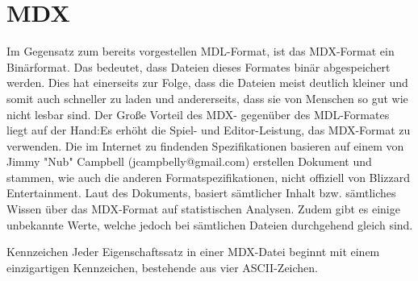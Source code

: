 \chapter{MDX}
Im Gegensatz zum bereits vorgestellen MDL-Format, ist das MDX-Format ein Binärformat. Das bedeutet, dass Dateien dieses Formates binär abgespeichert werden. Dies hat einerseits zur Folge, dass die Dateien meist deutlich kleiner und somit auch schneller zu laden und andererseits, dass sie von Menschen so gut wie nicht lesbar sind.
Der Große Vorteil des MDX- gegenüber des MDL-Formates liegt auf der Hand:Es erhöht die Spiel- und Editor-Leistung, das MDX-Format zu verwenden.
Die im Internet zu findenden Spezifikationen basieren auf einem von Jimmy "Nub" Campbell (jcampbelly@gmail.com) erstellen Dokument und stammen, wie auch die anderen Formatspezifikationen, nicht offiziell von Blizzard Entertainment.
Laut des Dokuments, basiert sämtlicher Inhalt bzw. sämtliches Wissen über das MDX-Format auf statistischen Analysen. Zudem gibt es einige unbekannte Werte, welche jedoch bei sämtlichen Dateien durchgehend gleich sind.

Kennzeichen
Jeder Eigenschaftssatz in einer MDX-Datei beginnt mit einem einzigartigen Kennzeichen, bestehende aus vier ASCII-Zeichen.
